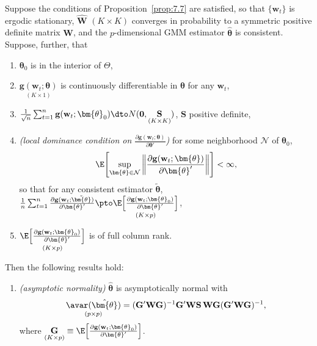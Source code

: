 \begin{proposition}
\label{prop:7.10}
Suppose the conditions of Proposition~\ref{prop:7.7} are satisfied, so that $\{\mathbf{w}_t\}$ is ergodic stationary, $\widehat{\mathbf{W}}$ $(K \times K)$ converges in probability to a symmetric positive definite matrix $\mathbf{W}$, and the $p$-dimensional GMM estimator $\hat{\bm{\theta}}$ is consistent. Suppose, further, that
\begin{enumerate}
\item[(1)] $\bm{\theta}_0$ is in the interior of $\Theta$,
\item[(2)] $\underset{(K \times 1)}{\mathbf{g}(\mathbf{w}_t; \bm{\theta})}$ is continuously differentiable in $\bm{\theta}$ for any $\mathbf{w}_t$,
\item[(3)] $\frac{1}{\sqrt{n}}\sum_{t=1}^{n}\mathbf{g}(\mathbf{w}_t; \bm{\theta}_0) \dto N(\mathbf{0}, \underset{(K \times K)}{\mathbf{S}})$, $\mathbf{S}$ positive definite,
\item[(4)] \emph{(local dominance condition on $\frac{\partial\mathbf{g}(\mathbf{w}_t; \bm{\theta})}{\partial\bm{\theta}'}$)} \enspace for some neighborhood $\mathcal{N}$ of $\bm{\theta}_0$,
\[
\E\!\left[\sup_{\bm{\theta} \in \mathcal{N}} \left\|\frac{\partial\mathbf{g}(\mathbf{w}_t; \bm{\theta})}{\partial\bm{\theta}'}\right\|\right] < \infty,
\]
so that for any consistent estimator $\tilde{\bm{\theta}}$, $\frac{1}{n}\sum_{t=1}^{n}\frac{\partial\mathbf{g}(\mathbf{w}_t; \tilde{\bm{\theta}})}{\partial\bm{\theta}'} \pto \underset{(K \times p)}{\E\!\left[\frac{\partial\mathbf{g}(\mathbf{w}_t; \bm{\theta}_0)}{\partial\bm{\theta}'}\right]}$,
\item[(5)] $\underset{(K \times p)}{\E\!\left[\frac{\partial\mathbf{g}(\mathbf{w}_t; \bm{\theta}_0)}{\partial\bm{\theta}'}\right]}$ is of full column rank.
\end{enumerate}
Then the following results hold:
\begin{enumerate}[label=(\alph*)]
\item \emph{(asymptotic normality)} \enspace $\hat{\bm{\theta}}$ is asymptotically normal with
\[
\underset{(p \times p)}{\avar(\hat{\bm{\theta}})} = (\mathbf{G}'\mathbf{W}\mathbf{G})^{-1}\mathbf{G}'\mathbf{W}\mathbf{S}\,\mathbf{W}\mathbf{G}(\mathbf{G}'\mathbf{W}\mathbf{G})^{-1},
\]
where $\underset{(K \times p)}{\mathbf{G}} \equiv \E\!\left[\frac{\partial\mathbf{g}(\mathbf{w}_t; \bm{\theta}_0)}{\partial\bm{\theta}'}\right]$.


\end{enumerate}
\end{proposition}
